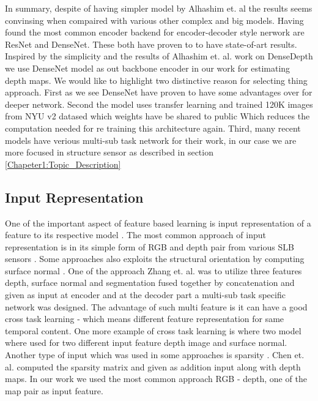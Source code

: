 In summary, despite of having simpler model by Alhashim et. al \cite{Alhashim2018}  the results seems convinsing when compaired with various other complex and big models. Having found the most common encoder backend for encoder-decoder style nerwork are  ResNet and DenseNet. These both have proven to to have state-of-art results. Inspired by the simplicity and the results of  Alhashim et. al. work on DenseDepth we use DenseNet model as out backbone encoder in our work for estimating depth maps. We would like to highlight two distinctive reason for selecting thing approach. First as we see DenseNet have proven to have some advantages over for deeper network. Second the model uses transfer learning and trained 120K images from NYU v2 datased which weights have be shared to public Which reduces the computation needed for re training this architecture again. Third, many recent models have verious multi-sub task network for their work, in our case we are more focused in structure sensor as described in section \ref{Chapeter1:Topic_Description}


\subsection{Input Representation}
One of the important aspect of feature based learning is input representation of a feature to its respective model \cite{friedman2001elements}. The most common approach of input representation is in its simple form of RGB and depth pair from various SLB sensors \cite{eigen2014depth, xu2017multi}. Some approaches also exploits the structural orientation by computing surface normal \cite{li2015depth, qi2018geonet}. One of the approach Zhang et. al. \cite{Zhang_2019_CVPR} was to utilize three features  depth, surface normal and segmentation fused together by concatenation and given as input at encoder and at the decoder part a multi-sub task specific network was designed. The advantage of such multi feature is it can have a good cross task learning - which means different feature representation for same temporal content. One more example of  cross task learning is \cite{qi2018geonet} where two model where used for two different input feature depth image and surface normal. Another type of input which was used in some approaches is sparsity  \cite{chen2018estimating, mal2018sparse}. Chen et. al. \cite{chen2018estimating} computed the sparsity matrix and given as addition input along with depth maps. In our work we used the most common approach RGB - depth, one of the map pair as input feature.  

